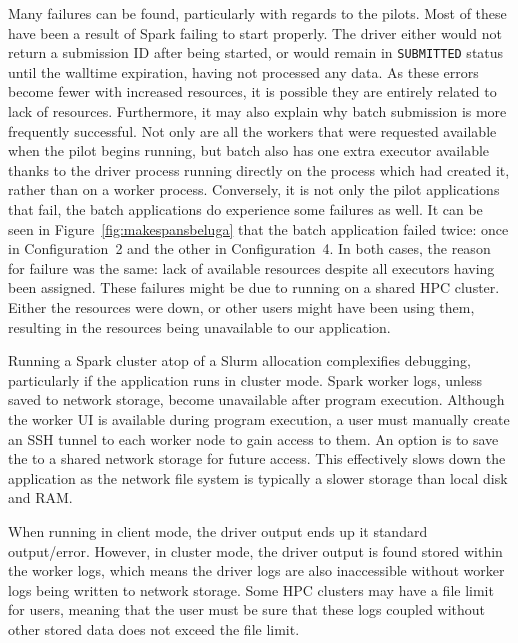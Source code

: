 \documentclass{IEEEtran}
\begin{document}
Many failures can be found, particularly with regards to the pilots. Most
of these have been a result of Spark failing to start properly. The driver
either would not return a submission ID after being started, or would
remain in \texttt{SUBMITTED} status until the walltime expiration, having
not processed any data. As these errors become fewer with increased
resources, it is possible they are entirely related to lack of resources.
Furthermore, it may also explain why batch submission is more frequently successful. Not
only are all the workers that were requested available when the pilot
begins running, but batch also has one extra executor available thanks to the driver
process running directly on the process which had created it, rather than on a
worker process. Conversely, it is not only the pilot applications that
fail, the batch applications do experience some failures as well. It can be
seen in Figure~\ref{fig:makespansbeluga} that the batch application failed
twice: once in Configuration~2 and the other in Configuration~4. In both
cases, the reason for failure was the same: lack of available resources
despite all executors having been assigned. These failures might be due to
running on a shared HPC cluster. Either the resources were down, or other users might
have been using them, resulting in the resources being unavailable to our
application.

Running a Spark cluster atop of a Slurm allocation complexifies debugging, particularly if the application runs in cluster mode.
Spark worker logs, unless saved to network storage, become unavailable after program execution.
Although the worker UI is available during program execution, a user must manually create an SSH tunnel
to each worker node to gain access to them.
An option is to save the to a shared network storage for future access. This effectively slows down
the application as the network file system is typically a slower storage than local disk and RAM.

When running in client mode, the driver output ends up it standard output/error. 
However, in cluster mode, the driver output is found stored within
the worker logs, which means the driver logs are also inaccessible without 
worker logs being written to network storage. Some HPC clusters
may have a file limit for users, meaning that the user must be sure that these 
logs coupled without other stored data does not exceed the file
limit.  
\end{document}
